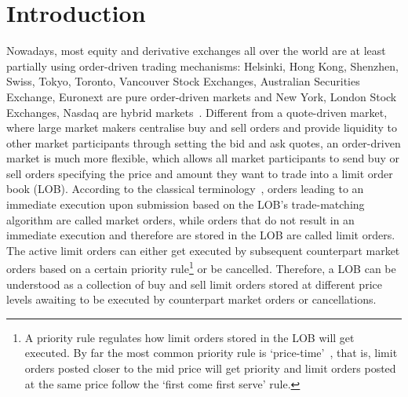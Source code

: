 \documentclass{amsart}[11pt]
\numberwithin{equation}{section}
\theoremstyle{definition}
\begin{document}
\section{Introduction}
Nowadays, most equity and derivative exchanges all over the world are at least partially using order-driven trading mechanisms:
Helsinki, Hong Kong, Shenzhen, Swiss, Tokyo, Toronto, Vancouver Stock Exchanges, 
Australian Securities Exchange, Euronext
are pure order-driven markets 
and New York, London Stock Exchanges, Nasdaq are hybrid markets~\cite{gould2013limit}.
Different from a quote-driven market, where large market makers centralise buy and sell orders and provide liquidity to other market participants through setting the bid and ask quotes,
an order-driven market is much more flexible,
which allows all market participants to send buy or sell orders specifying the price and amount they want to trade into a limit order book (LOB). 
According to the classical terminology~\cite[Section~2.2]{gould2013limit}, 
orders leading to an immediate execution upon submission based on the LOB's trade-matching algorithm are called market orders,
while orders that do not result in an immediate execution and therefore are stored in the LOB are called limit orders.
The active limit orders can either get executed by subsequent counterpart market orders based on a certain priority rule\footnote{
A priority rule regulates how limit orders stored in the LOB will get executed.
By far the most common priority rule is `{price-time}'~\cite[Section 3.4]{gould2013limit},
that is,
limit orders posted closer to the mid price will get priority and
limit orders posted at the same price follow the `first come first serve' rule.}
or be cancelled.
Therefore, a LOB can be understood as a collection of buy and sell limit orders stored at different price levels awaiting to be executed by counterpart market orders or cancellations. 
\end{document}
